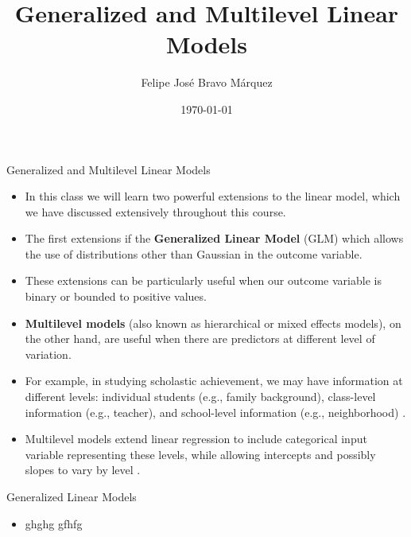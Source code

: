 \documentclass[handout]{beamer}
\title{Generalized and Multilevel Linear Models}
\author[Felipe Bravo Márquez]{\footnotesize
 \textcolor[rgb]{0.00,0.00,1.00}{Felipe José Bravo Márquez}}
\date{ \today }
\begin{document}
\begin{frame}
\titlepage


\end{frame}




\begin{frame}{Generalized and Multilevel Linear Models}
\scriptsize{
\begin{itemize}
\item In this class we will learn two powerful extensions to the linear model, which we have discussed extensively throughout this course.

\item The first extensions if the \textbf{Generalized Linear Model} (GLM) which allows the use of distributions other than Gaussian in the outcome variable.

\item These extensions can be particularly useful when our outcome variable  is binary or bounded to positive values.

\item \textbf{Multilevel models} (also known as hierarchical or mixed effects models), on the other hand, are useful when there are predictors at different level of variation.

\item For example, in studying scholastic achievement, we may have information at different levels:  individual students  (e.g., family background), class-level information (e.g., teacher), and school-level information (e.g., neighborhood) \cite{gelman2013bayesian}.


\item Multilevel models extend linear regression to include categorical input variable representing these levels, while allowing intercepts and possibly slopes to vary by level \cite{gelman2006data}.



\end{itemize}



}

\end{frame}


\begin{frame}{Generalized Linear Models}
\scriptsize{
\begin{itemize}
\item ghghg  gfhfg\cite{mcelreath2020statistical}
 
\end{itemize}



} 

\end{frame}
\end{document}
